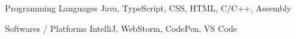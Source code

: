 
\begin{cvskills}
  \cvskill
    {Programming Languages} %
    {Java, TypeScript, CSS, HTML, C/C++, Assembly} %

  \cvskill
    {Softwares / Platforms} %
    {IntelliJ, WebStorm, CodePen, VS Code } %
\end{cvskills}
